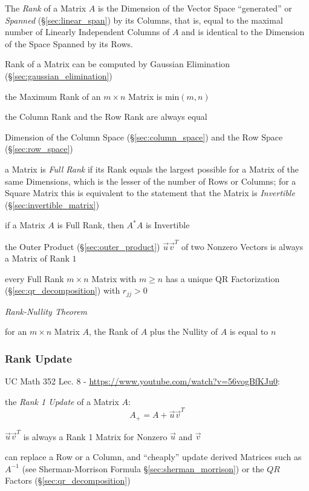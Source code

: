 The \emph{Rank} of a Matrix $A$ is the Dimension of the Vector Space
``generated'' or \emph{Spanned} (\S\ref{sec:linear_span}) by its Columns, that
is, equal to the maximal number of Linearly Independent Columns of $A$ and is
identical to the Dimension of the Space Spanned by its Rows.

\fist Rank of a Matrix can be computed by Gaussian Elimination
(\S\ref{sec:gaussian_elimination})

the Maximum Rank of an $m \times n$ Matrix is $\mathrm{min}(m,n)$

the Column Rank and the Row Rank are always equal

Dimension of the Column Space (\S\ref{sec:column_space}) and the Row Space
(\S\ref{sec:row_space})

a Matrix is \emph{Full Rank} if its Rank equals the largest possible for a
Matrix of the same Dimensions, which is the lesser of the number of Rows or
Columns; for a Square Matrix this is equivalent to the statement that the
Matrix is \emph{Invertible} (\S\ref{sec:invertible_matrix})

if a Matrix $A$ is Full Rank, then $A^*A$ is Invertible

the Outer Product (\S\ref{sec:outer_product}) $\vec{u}\vec{v}^T$ of two Nonzero
Vectors is always a Matrix of Rank $1$

every Full Rank $m \times n$ Matrix with $m \geq n$ has a unique QR
Factorization (\S\ref{sec:qr_decomposition}) with $r_{jj} > 0$

\emph{Rank-Nullity Theorem}

for an $m \times n$ Matrix $A$, the Rank of $A$ plus the Nullity of $A$ is
equal to $n$



\subsubsection{Rank Update}\label{sec:rank_update}

UC Math 352 Lec. 8 - \url{https://www.youtube.com/watch?v=56vogBfKJu0}:

the \emph{Rank 1 Update} of a Matrix $A$:
\[
  A_+ = A + \vec{u}\vec{v}^T
\]

$\vec{u}\vec{v}^T$ is always a Rank 1 Matrix for Nonzero $\vec{u}$ and
$\vec{v}$

can replace a Row or a Column, and ``cheaply'' update derived Matrices such as
$A^{-1}$ (see Sherman-Morrison Formula \S\ref{sec:sherman_morrison}) or the
$QR$ Factors (\S\ref{sec:qr_decomposition})



